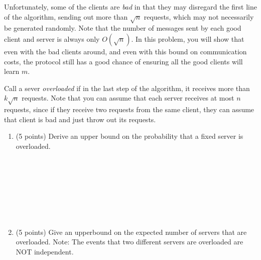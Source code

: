 \documentclass[11pt]{article}
\newcommand{\ans}[1]{ }
\begin{document}
\begin{enumerate}
Unfortunately, some of the clients are \emph{bad} in that they may disregard the first line of the algorithm, sending out more than $\sqrt{n}$ requests, which may not necessarily be generated randomly.  Note that the number of messages sent by each good client and server is always only $O(\sqrt{n})$.  In this problem, you will show that even with the bad clients around, and even with this bound on communication costs, the protocol still has a good chance of ensuring all the good clients will learn $m$.

Call a sever \emph{overloaded} if in the last step of the algorithm, it receives more than $k\sqrt{n}$ requests.  Note that you can assume that each server receives at most $n$ requests, since if they receive two requests from the same client, they can assume that client is bad and just throw out its requests.  
\begin{enumerate}

\item (5 points) Derive an upper bound on the probability that a fixed server is overloaded.
\ans{There are at most $n$ requests total that each server receives and these are distributed over $\sqrt{n}$ possible tags.  Thus, at most $\sqrt{n}/k$ of the tags have more than $k \sqrt{n}$ requests.  Thus the probability of being overloaded is at most $1/k$} \\ \ \\ \ \\ \ \\ \ \\ \ \\ \ \\ \ \\
  
\pagebreak 
  
\item (5 points) Give an upperbound on the expected number of servers that are overloaded.  Note: The events that two different servers are overloaded are NOT independent.

\ans{Using linearity of expectation, the expected number of informed processors that are overloaded is at most $n/k$}  \ \\ \ \\ \ \\ \ \\ \ \\ \ \\ \ \\ \ \\


\end{enumerate}
\end{enumerate}
\end{document}
